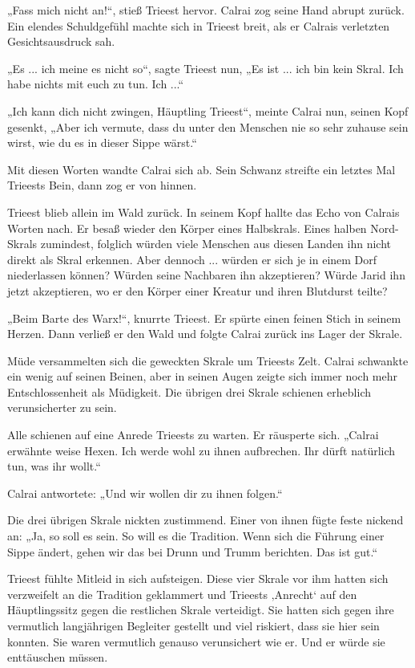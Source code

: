 „Fass mich nicht an!“, stieß Trieest hervor. Calrai zog seine Hand abrupt zurück. Ein elendes Schuldgefühl machte sich in Trieest breit, als er Calrais verletzten Gesichtsausdruck sah.

„Es ... ich meine es nicht so“, sagte Trieest nun, „Es ist ... ich bin kein Skral. Ich habe nichts mit euch zu tun. Ich ...“

„Ich kann dich nicht zwingen, Häuptling Trieest“, meinte Calrai nun, seinen Kopf gesenkt, „Aber ich vermute, dass du unter den Menschen nie so sehr zuhause sein wirst, wie du es in dieser Sippe wärst.“

Mit diesen Worten wandte Calrai sich ab. Sein Schwanz streifte ein letztes Mal Trieests Bein, dann zog er von hinnen.

Trieest blieb allein im Wald zurück. In seinem Kopf hallte das Echo von Calrais Worten nach. Er besaß wieder den Körper eines Halbskrals. Eines halben Nord-Skrals zumindest, folglich würden viele Menschen aus diesen Landen ihn nicht direkt als Skral erkennen. Aber dennoch ... würden er sich je in einem Dorf niederlassen können? Würden seine Nachbaren ihn akzeptieren? Würde Jarid ihn jetzt akzeptieren, wo er den Körper einer Kreatur und ihren Blutdurst teilte?

„Beim Barte des Warx!“, knurrte Trieest. Er spürte einen feinen Stich in seinem Herzen. Dann verließ er den Wald und folgte Calrai zurück ins Lager der Skrale.\bigskip







Müde versammelten sich die geweckten Skrale um Trieests Zelt. Calrai schwankte ein wenig auf seinen Beinen, aber in seinen Augen zeigte sich immer noch mehr Entschlossenheit als Müdigkeit. Die übrigen drei Skrale schienen erheblich verunsicherter zu sein.

Alle schienen auf eine Anrede Trieests zu warten. Er räusperte sich. „Calrai erwähnte weise Hexen. Ich werde wohl zu ihnen aufbrechen. Ihr dürft natürlich tun, was ihr wollt.“

Calrai antwortete: „Und wir wollen dir zu ihnen folgen.“

Die drei übrigen Skrale nickten zustimmend. Einer von ihnen fügte feste nickend an: „Ja, so soll es sein. So will es die Tradition. Wenn sich die Führung einer Sippe ändert, gehen wir das bei Drunn und Trumm berichten. Das ist gut.“

Trieest fühlte Mitleid in sich aufsteigen. Diese vier Skrale vor ihm hatten sich verzweifelt an die Tradition geklammert und Trieests ‚Anrecht‘ auf den Häuptlingssitz gegen die restlichen Skrale verteidigt. Sie hatten sich gegen ihre vermutlich langjährigen Begleiter gestellt und viel riskiert, dass sie hier sein konnten. Sie waren vermutlich genauso verunsichert wie er. Und er würde sie enttäuschen müssen.

